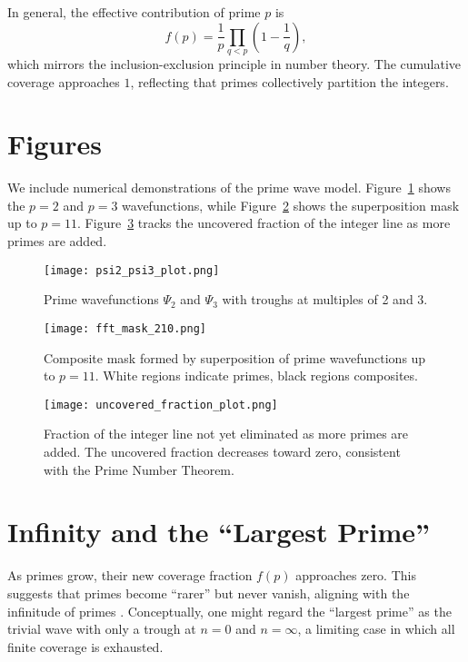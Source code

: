 \documentclass[reprint,amsmath,amssymb,aps,pra]{revtex4-2}
\begin{document}
In general, the effective contribution of prime $p$ is
\begin{equation}
f(p) = \frac{1}{p} \prod_{q < p} \left(1-\frac{1}{q}\right),
\end{equation}
which mirrors the inclusion-exclusion principle in number theory. The cumulative coverage approaches $1$, reflecting that primes collectively partition the integers.

\section{Figures}
We include numerical demonstrations of the prime wave model. Figure~\ref{fig:psi2psi3} shows the $p=2$ and $p=3$ wavefunctions, while Figure~\ref{fig:fftmask} shows the superposition mask up to $p=11$. Figure~\ref{fig:coverage} tracks the uncovered fraction of the integer line as more primes are added.

\begin{figure}[h]
\texttt{[image: psi2\_psi3\_plot.png]}
\caption{Prime wavefunctions $\Psi_2$ and $\Psi_3$ with troughs at multiples of 2 and 3.}
\label{fig:psi2psi3}
\end{figure}

\begin{figure}[h]
\texttt{[image: fft\_mask\_210.png]}
\caption{Composite mask formed by superposition of prime wavefunctions up to $p=11$. White regions indicate primes, black regions composites.}
\label{fig:fftmask}
\end{figure}

\begin{figure}[h]
\texttt{[image: uncovered\_fraction\_plot.png]}
\caption{Fraction of the integer line not yet eliminated as more primes are added. The uncovered fraction decreases toward zero, consistent with the Prime Number Theorem.}
\label{fig:coverage}
\end{figure}

\section{Infinity and the ``Largest Prime''}
As primes grow, their new coverage fraction $f(p)$ approaches zero. This suggests that primes become ``rarer'' but never vanish, aligning with the infinitude of primes \cite{Euclid}. Conceptually, one might regard the ``largest prime'' as the trivial wave with only a trough at $n=0$ and $n=\infty$, a limiting case in which all finite coverage is exhausted.
\end{document}
